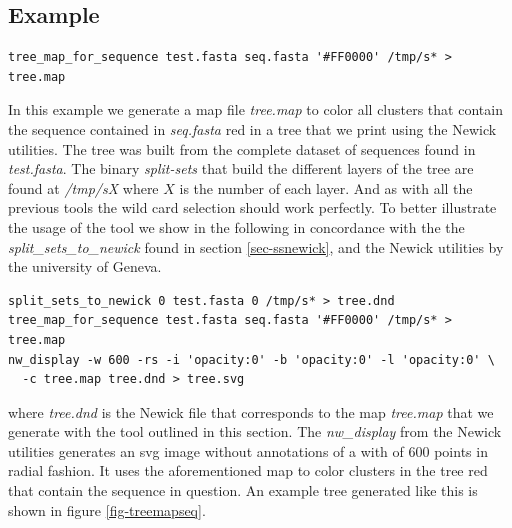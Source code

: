 \subsection{Example}
\begin{lstlisting}
tree_map_for_sequence test.fasta seq.fasta '#FF0000' /tmp/s* > tree.map
\end{lstlisting}
In this example we generate a map file \emph{tree.map} to color all
clusters that contain the sequence contained in \emph{seq.fasta} red in a
tree that we print using the Newick utilities. The tree was built from
the complete dataset of sequences found in \emph{test.fasta}. The
binary \emph{split-sets} that build the different layers of the tree
are found at \emph{/tmp/sX} where $X$ is the number of each layer. And
as with all the previous tools the wild card selection should work
perfectly. To better illustrate the usage of the tool we show in the
following in concordance with the the \emph{split\_sets\_to\_newick}
found in section \ref{sec-ssnewick}, and the Newick utilities
\cite{newick_tools} by the university of Geneva.
\begin{lstlisting}
split_sets_to_newick 0 test.fasta 0 /tmp/s* > tree.dnd
tree_map_for_sequence test.fasta seq.fasta '#FF0000' /tmp/s* > tree.map
nw_display -w 600 -rs -i 'opacity:0' -b 'opacity:0' -l 'opacity:0' \
  -c tree.map tree.dnd > tree.svg
\end{lstlisting}
where \emph{tree.dnd} is the Newick file that corresponds to the map
\emph{tree.map} that we generate with the tool outlined in this
section. The \emph{nw\_display} from the Newick utilities
\cite{newick_tools} generates an svg image without annotations of a
with of 600 points in radial fashion. It uses the aforementioned map
to color clusters in the tree red that contain the sequence in
question. An example tree generated like this is shown in figure
\ref{fig-treemapseq}.

